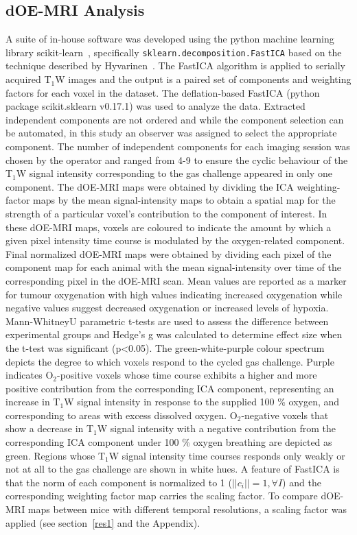 \subsection{dOE-MRI Analysis}
A suite of in-house software was developed using the python machine learning library scikit-learn~\cite{Pedregosa:2011tv}, specifically \texttt{sklearn.decomposition.FastICA} based on the technique described by Hyvarinen~\cite{Hyvarinen:2000vk}.
The FastICA algorithm is applied to serially acquired T$_1$W images and the output is a paired set of components and weighting factors for each voxel in the dataset.
The deflation-based FastICA (python package scikit.sklearn v0.17.1) was used to analyze the data. 
Extracted independent components are not ordered and while the component selection can be automated, in this study an observer was assigned to select the appropriate component.
The number of independent components for each imaging session was chosen by the operator and ranged from 4-9 to ensure the cyclic behaviour of the T$_1$W signal intensity corresponding to the gas challenge appeared in only one component. 
The dOE-MRI maps were obtained by dividing the ICA weighting-factor maps by the mean signal-intensity maps to obtain a spatial map for the strength of a particular voxel's contribution to the component of interest.
In these dOE-MRI maps, voxels are coloured to indicate the amount by which a given pixel intensity time course is modulated by the oxygen-related component. 
Final normalized dOE-MRI maps were obtained by dividing each pixel of the component map for each animal with the mean signal-intensity over time of the corresponding pixel in the dOE-MRI scan. 
Mean values are reported as a marker for tumour oxygenation with high values indicating increased oxygenation while negative values suggest decreased oxygenation or increased levels of hypoxia. 
Mann-WhitneyU parametric t-tests are used to assess the difference between experimental groups and Hedge's g was calculated to determine effect size when the t-test was significant (p<0.05).
The green-white-purple colour spectrum depicts the degree to which voxels respond to the cycled gas challenge.
Purple indicates O$_2$-positive voxels whose time course exhibits a higher and more positive contribution from the corresponding ICA component, representing an increase in T$_1$W signal intensity in response to the supplied 100 \% oxygen, and corresponding to areas with excess dissolved oxygen. 
O$_2$-negative voxels that show a decrease in T$_1$W signal intensity with a negative contribution from the corresponding ICA component under 100 \% oxygen breathing are depicted as green. 
Regions whose T$_1$W signal intensity time courses responds only weakly or not at all to the gas challenge are shown in white hues.
A feature of FastICA is that the norm of each component is normalized to 1 ($||c_i||=1, \forall I$) and the corresponding weighting factor map carries the scaling factor.
To compare dOE-MRI maps between mice with different temporal resolutions, a scaling factor was applied (see section~\ref{res1} and the Appendix).

